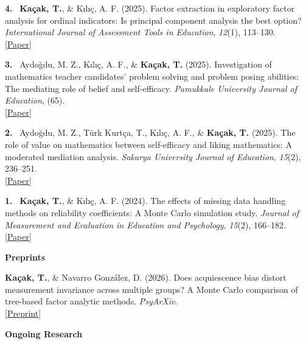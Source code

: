 \documentclass[10pt,a4paper]{article}
\newcommand{\me}[1]{\textbf{\color{headwhite}#1}}
\newcommand{\pubnum}[1]{\textbf{\color{headwhite}#1.}~}
\begin{document}
\pubnum{4} \me{Kaçak, T.}, \& Kılıç, A. F. (2025). Factor extraction in exploratory factor analysis for ordinal indicators: Is principal component analysis the best option? \textit{International Journal of Assessment Tools in Education}, \textit{12}(1), 113--130.\\
{\small \href{https://doi.org/10.21449/ijate.1481201}{\color{linkblue}[Paper]}}
\vspace{6pt}

\pubnum{3} Aydo\u{g}du, M. Z., Kılıç, A. F., \& \me{Kaçak, T.} (2025). Investigation of mathematics teacher candidates' problem solving and problem posing abilities: The mediating role of belief and self-efficacy. \textit{Pamukkale University Journal of Education}, (65).\\
{\small \href{https://doi.org/10.9779/pauefd.1530235}{\color{linkblue}[Paper]}}
\vspace{6pt}

\pubnum{2} Aydo\u{g}du, M. Z., T\"urk Kurtça, T., Kılıç, A. F., \& \me{Kaçak, T.} (2025). The role of value on mathematics between self-efficacy and liking mathematics: A moderated mediation analysis. \textit{Sakarya University Journal of Education}, \textit{15}(2), 236--251.\\
{\small \href{https://doi.org/10.19126/suje.1621346}{\color{linkblue}[Paper]}}
\vspace{6pt}

\pubnum{1} \me{Kaçak, T.}, \& Kılıç, A. F. (2024). The effects of missing data handling methods on reliability coefficients: A Monte Carlo simulation study. \textit{Journal of Measurement and Evaluation in Education and Psychology}, \textit{15}(2), 166--182.\\
{\small \href{https://doi.org/10.21031/epod.1485482}{\color{linkblue}[Paper]}}

\vspace{10pt}
{\color{headwhite}\bfseries\normalsize Preprints}
\vspace{4pt}

\me{Kaçak, T.}, \& Navarro Gonz\'alez, D. (2026). Does acquiescence bias distort measurement invariance across multiple groups? A Monte Carlo comparison of tree-based factor analytic methods. \textit{PsyArXiv}.\\
{\small \href{https://doi.org/10.31234/osf.io/myk4s}{\color{linkblue}[Preprint]}}

\vspace{10pt}
{\color{headwhite}\bfseries\normalsize Ongoing Research}
\vspace{4pt}
\end{document}
